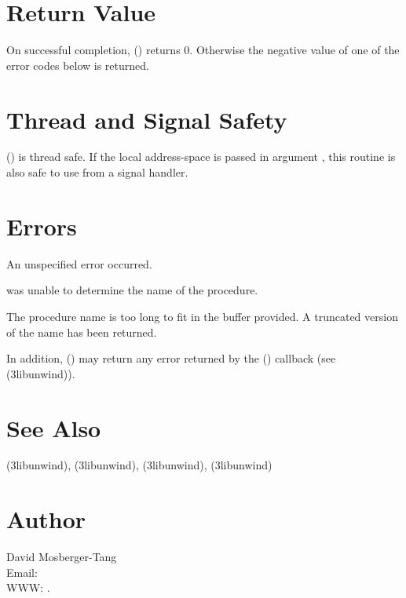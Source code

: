 \documentclass{article}
\begin{document}
\section{Return Value}

On successful completion, ()
returns 0.  Otherwise the negative value of one of the error codes
below is returned.

\section{Thread and Signal Safety}

() is thread safe.  If the local
address-space is passed in argument , this routine is also
safe to use from a signal handler.

\section{Errors}

\begin{Description}
\item[\Const{UNW\_EUNSPEC}] An unspecified error occurred.
\item[\Const{UNW\_ENOINFO}]  was unable to determine
  the name of the procedure.
\item[\Const{UNW\_ENOMEM}] The procedure name is too long to fit
  in the buffer provided.  A truncated version of the name has been
  returned.
\end{Description}
In addition, () may return any error
returned by the () callback (see
(3libunwind)).

\section{See Also}

(3libunwind),
(3libunwind),
(3libunwind),
(3libunwind)

\section{Author}

\noindent
David Mosberger-Tang\\
Email: \\
WWW: .
\LatexManEnd
\end{document}
